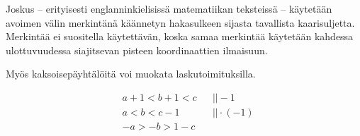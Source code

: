 Joskus -- erityisesti englanninkielisissä matematiikan teksteissä -- käytetään avoimen välin merkintänä käännetyn hakasulkeen sijasta tavallista kaarisuljetta. Merkintää ei suositella käytettävän, koska samaa merkintää käytetään kahdessa ulottuvuudessa siajitsevan pisteen koordinaattien ilmaisuun.

\begin{esimerkki}
	\alakohdat{
	§ Avoin väli $]1,9[$ kirjoitetaan joskus $(1,9)$.
	§ Puoliavoin väli $]3,4]$ kirjoitetaan joskus $(3,4]$.
	}
\end{esimerkki}

Myös kaksoisepäyhtälöitä voi muokata laskutoimituksilla.

\begin{esimerkki}
\begin{align*}
& a+1<b+1<c && ||-1 \\
&a<b<c-1 && ||\cdot(-1) \\
&-a>-b>1-c &&
\end{align*}
\end{esimerkki}